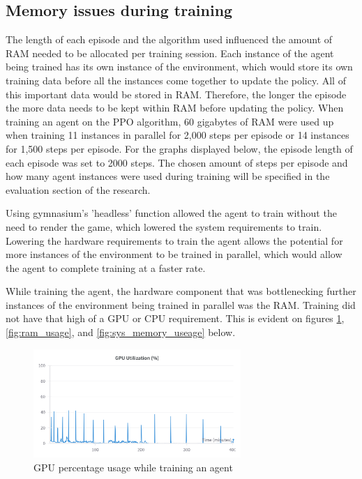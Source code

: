 \subsection{Memory issues during training}

The length of each episode and the algorithm used influenced the amount of RAM needed to be allocated per training session. Each instance of the agent being trained has its own instance of the environment, which would store its own training data before all the instances come together to update the policy. All of this important data would be stored in RAM. Therefore, the longer the episode the more data needs to be kept within RAM before updating the policy. When training an agent on the PPO algorithm, 60 gigabytes of RAM were used up when training 11 instances in parallel for 2,000 steps per episode or 14 instances for 1,500 steps per episode. For the graphs displayed below, the episode length of each episode was set to 2000 steps. The chosen amount of steps per episode and how many agent instances were used during training will be specified in the evaluation section of the research. 

Using gymnasium's 'headless' function allowed the agent to train without the need to render the game, which lowered the system requirements to train. Lowering the hardware requirements to train the agent allows the potential for more instances of the environment to be trained in parallel, which would allow the agent to complete training at a faster rate.

While training the agent, the hardware component that was bottlenecking further instances of the environment being trained in parallel was the RAM. Training did not have that high of a GPU or CPU requirement. This is evident on figures \ref{fig:gpu_memory_usage}, \ref{fig:ram_usage}, and \ref{fig:sys_memory_useage} below. 

\begin{figure}[H]
    \centering
    \includegraphics[width=0.7\textwidth]{figures/GPU_Utilization.png}
    \caption{GPU percentage usage while training an agent}
    \label{fig:gpu_memory_usage}
\end{figure}

